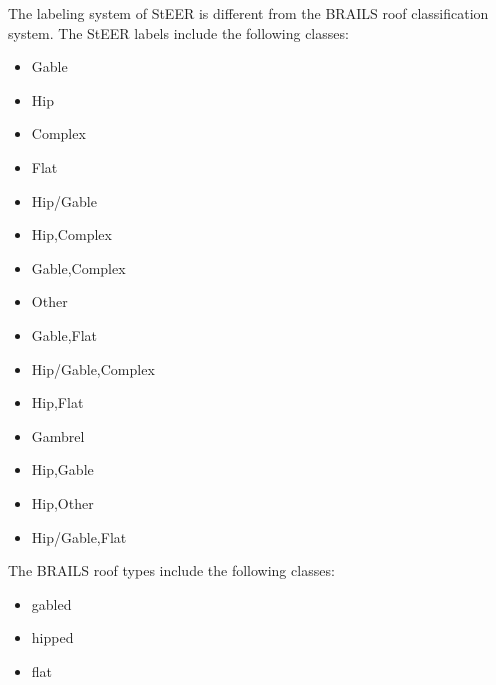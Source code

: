 \documentclass[letterpaper,10pt,english]{sphinxmanual}
\begin{document}
\sphinxAtStartPar
The labeling system of StEER is different from the BRAILS roof classification system.
The StEER labels include the following classes:
\begin{itemize}
\item {} 
\sphinxAtStartPar
Gable

\item {} 
\sphinxAtStartPar
Hip

\item {} 
\sphinxAtStartPar
Complex

\item {} 
\sphinxAtStartPar
Flat

\item {} 
\sphinxAtStartPar
Hip/Gable

\item {} 
\sphinxAtStartPar
Hip,Complex

\item {} 
\sphinxAtStartPar
Gable,Complex

\item {} 
\sphinxAtStartPar
Other

\item {} 
\sphinxAtStartPar
Gable,Flat

\item {} 
\sphinxAtStartPar
Hip/Gable,Complex

\item {} 
\sphinxAtStartPar
Hip,Flat

\item {} 
\sphinxAtStartPar
Gambrel

\item {} 
\sphinxAtStartPar
Hip,Gable

\item {} 
\sphinxAtStartPar
Hip,Other

\item {} 
\sphinxAtStartPar
Hip/Gable,Flat

\end{itemize}

\sphinxAtStartPar
The BRAILS roof types include the following classes:
\begin{itemize}
\item {} 
\sphinxAtStartPar
gabled

\item {} 
\sphinxAtStartPar
hipped

\item {} 
\sphinxAtStartPar
flat

\end{itemize}
\end{document}

